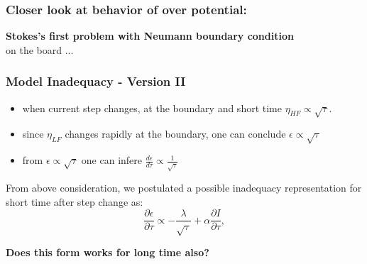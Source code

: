\documentclass[10pt,xcolor=dvipsnames,compress]{beamer}
\begin{document}
\begin{frame}
\frametitle{Closer look at behavior of over potential:}
\vfill

\begin{center}
\textbf{\large Stokes's first problem with Neumann boundary condition}\\
on the board ...
\end{center}

\vfill
\end{frame}


\begin{frame}
\frametitle{Model Inadequacy - Version II}
\vfill

\begin{itemize}
\item when current step changes, at the boundary and short time $\eta_{HF} \propto \sqrt{\tau}$.
\item since $\eta_{LF}$ changes rapidly at the boundary, one can conclude $\epsilon \propto \sqrt{\tau}$
\item from $\epsilon \propto \sqrt{\tau}$ one can infere $\frac{d\epsilon}{d\tau} \propto \frac{1}{\sqrt{\tau}}$
\end{itemize}

\pause
From above consideration, we postulated a possible inadequacy representation for short time after step change  as: 
\begin{equation*}
\frac{\partial\epsilon}{\partial\tau} \propto -\frac{\lambda}{\sqrt{\tau}} + \alpha \frac{\partial I}{\partial\tau},
\end{equation*}

\pause
\begin{center}
\textbf{Does this form works for long time also?}
\end{center}

\vfill
\end{frame}
\end{document}
